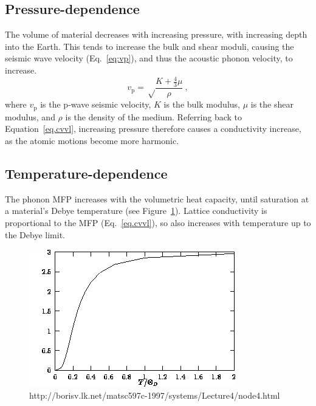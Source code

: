 \subsection{Pressure-dependence}

The volume of material decreases with increasing pressure, with increasing depth into the Earth. This tends to increase the bulk and shear moduli, causing the seismic wave velocity (Eq.~\ref{eq:vp}), and thus the acoustic phonon velocity, to increase. 
%
\begin{equation}
v_{\mathrm{p}} = \sqrt \frac{K+\frac{4}{3}\mu}{\rho}\ ,
\label{eq:vp}
\end{equation}
%
where $v_{\mathrm{p}}$ is the p-wave seismic velocity, $K$ is the bulk modulus, $\mu$ is the shear modulus, and $\rho$ is the density of the medium. Referring back to Equation~\ref{eq.cvvl}, increasing pressure therefore causes a conductivity increase, as the atomic motions become more harmonic. 

\subsection{Temperature-dependence}

The phonon MFP increases with the volumetric heat capacity, until saturation at a material's Debye temperature (see Figure~\ref{fig:debye-model}). Lattice conductivity is proportional to the MFP (Eq.~\ref{eq.cvvl}), so also increases with temperature up to the Debye limit. 

\begin{figure}[h!]
  \includegraphics[width=\linewidth]{Figures/debye-model.png}
  \caption[DEBYE MODEL]{http://borisv.lk.net/matsc597c-1997/systems/Lecture4/node4.html}
  \label{fig:debye-model}
\end{figure}

